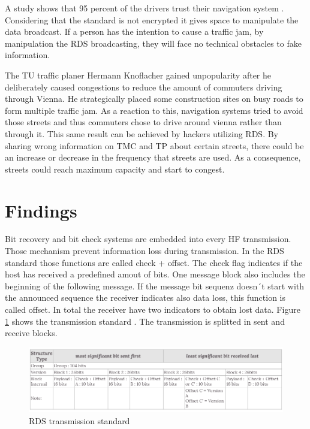 \documentclass[conference,12pt,a4paper]{IEEEtran}
\begin{document}
	A study shows that 95 percent of the drivers trust their navigation system \cite{trustNavi_stanton2014advances}. Considering that the standard is not encrypted it gives space to manipulate the data broadcast. If a person has the intention to cause a traffic jam, by manipulation the RDS broadcasting, they will face no technical obstacles to fake information. 
	
	The TU traffic planer Hermann Knoflacher gained unpopularity after he deliberately caused congestions to reduce the amount of commuters driving through Vienna.	He strategically placed some construction sites on busy roads to form multiple traffic jam\cite{presse}. As a reaction to this, navigation systems tried to avoid those streets and thus commuters chose to drive around vienna rather than through it. This same result can be achieved by hackers utilizing RDS. By sharing wrong information on TMC and TP about certain streets, there could be an increase or decrease in the frequency that streets are used. As a consequence, streets could reach maximum capacity and start to congest.\\
	
	
	\section{Findings}
	
	Bit recovery and bit check systems are embedded into every HF transmission. Those mechanism prevent information loss during transmission. In the RDS standard those functions are called check + offset. The check flag indicates if the host has received a predefined amout of bits. One message block also includes the beginning of the following message. If the message bit sequenz doesn´t start with the announced sequence the receiver indicates also data loss, this function is called offset. In total the receiver have two indicators to obtain lost data. Figure \ref{fig: standard} shows the transmission standard \cite{DIN_EN}. The transmission is splitted in sent and receive blocks.
	
	
	\begin{figure}[h]
		\centering
		\includegraphics[scale=0.265]{img/standard}
		\caption{RDS transmission standard}
		\label{fig: standard}
	\end{figure}
\end{document}
